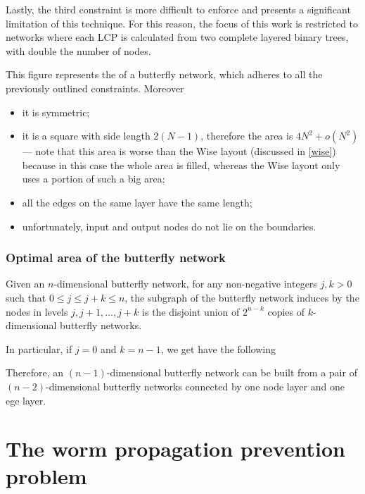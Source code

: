 \documentclass[a4paper, 12pt]{report}
\begin{document}
    Lastly, the third constraint is more difficult to enforce and presents a significant limitation of this technique. For this reason, the focus of this work is restricted to networks where each LCP is calculated from two complete layered binary trees, with double the number of nodes.


    This figure represents the  of a butterfly network, which adheres to all the previously outlined constraints. Moreover

    \begin{itemize}
        \item it is symmetric;
        \item it is a square with side length $2(N - 1)$, therefore the area is $4N^2 + o(N^2)$ --- note that this area is worse than the Wise layout (discussed in \cref{wise}) because in this case the whole area is filled, whereas the Wise layout only uses a portion of such a big area;
        \item all the edges on the same layer have the same length;
        \item unfortunately, input and output nodes do not lie on the boundaries.
    \end{itemize}

    \subsection{Optimal area of the butterfly network}

    \begin{framedlem}{}
        Given an $n$-dimensional butterfly network, for any non-negative integers $j, k > 0$ such that $0 \le j \le j + k \le n$, the subgraph of the butterfly network induces by the nodes in levels $j, j + 1, \ldots, j + k$ is the disjoint union of $2^{n - k}$ copies of $k$-dimensional butterfly networks.
    \end{framedlem}

    In particular, if $j = 0$ and $k = n - 1$, we get have the following 

    Therefore, an $(n - 1)$-dimensional butterfly network can be built from a pair of $(n - 2)$-dimensional butterfly networks connected by one node layer and one ege layer. 

    \chapter{The worm propagation prevention problem}
\end{document}
